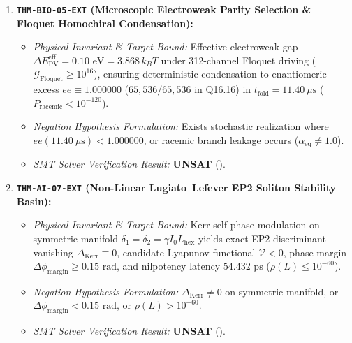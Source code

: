 \documentclass[11pt,onecolumn]{article}
\begin{document}
\begin{enumerate}
    \item \textbf{\texttt{THM-BIO-05-EXT} (Microscopic Electroweak Parity Selection \& Floquet Homochiral Condensation):}
    \begin{itemize}
        \item \emph{Physical Invariant \& Target Bound:} Effective electroweak gap $\Delta E_{\mathrm{PV}}^{\mathrm{eff}} = 0.10\text{ eV} = 3.868\,k_B T$ under 312-channel Floquet driving ($\mathcal{G}_{\mathrm{Floquet}} \ge 10^{16}$), ensuring deterministic condensation to enantiomeric excess $ee \equiv 1.000000$ ($65{,}536/65{,}536$ in Q16.16) in $t_{\mathrm{fold}} = 11.40\ \mu\mathrm{s}$ ($P_{\mathrm{racemic}} < 10^{-120}$).
        \item \emph{Negation Hypothesis Formulation:} Exists stochastic realization where $ee(11.40\ \mu\mathrm{s}) < 1.000000$, or racemic branch leakage occurs ($\alpha_{\mathrm{eq}} \neq 1.0$).
        \item \emph{SMT Solver Verification Result:} \textbf{UNSAT} ().
    \end{itemize}

    \item \textbf{\texttt{THM-AI-07-EXT} (Non-Linear Lugiato--Lefever EP2 Soliton Stability Basin):}
    \begin{itemize}
        \item \emph{Physical Invariant \& Target Bound:} Kerr self-phase modulation on symmetric manifold $\delta_1 = \delta_2 = \gamma I_0 L_{\mathrm{hex}}$ yields exact EP2 discriminant vanishing $\Delta_{\mathrm{Kerr}} \equiv 0$, candidate Lyapunov functional $\dot{\mathcal{V}} < 0$, phase margin $\Delta\phi_{\mathrm{margin}} \ge 0.15\text{ rad}$, and nilpotency latency $54.432\text{ ps}$ ($\rho(L) \le 10^{-60}$).
        \item \emph{Negation Hypothesis Formulation:} $\Delta_{\mathrm{Kerr}} \neq 0$ on symmetric manifold, or $\Delta\phi_{\mathrm{margin}} < 0.15\text{ rad}$, or $\rho(L) > 10^{-60}$.
        \item \emph{SMT Solver Verification Result:} \textbf{UNSAT} ().
    \end{itemize}


\end{enumerate}
\end{document}
